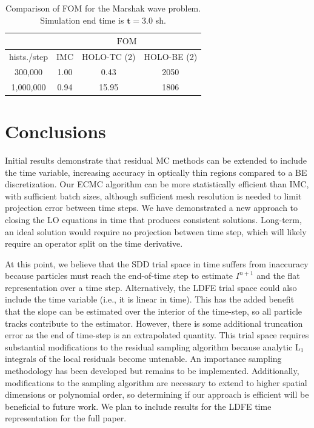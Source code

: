 \documentclass{anstrans}
\newcommand{\FOM}{\ensuremath{\text{FOM}}}
\begin{document}
\begin{table}[H]
\centering
\caption{\label{tab:marshak_cont} {Comparison of FOM for the Marshak
    wave problem.  Simulation end time is $\mathbf{t=3.0}$ sh.}}
\begin{tabular}{|c|ccc|}\cline{2-4}
    \multicolumn{1}{c|}{}        &
    \multicolumn{3}{|c|}{\FOM} \\ \hline
hists./step    &  IMC   & HOLO-TC (2) & HOLO-BE (2) \\ \hline
  300,000      &  1.00  &   0.43    & 2050          \\  
  1,000,000    &  0.94  &  15.95    & 1806          \\ \hline
\end{tabular}
\end{table}


\section{Conclusions}

Initial results demonstrate that residual MC methods can be extended to include
the time variable, increasing accuracy in optically thin regions compared to a
BE discretization.   Our ECMC algorithm can be more statistically efficient
than IMC, with sufficient batch sizes, although sufficient mesh resolution is needed to limit projection
error between time steps.  We have demonstrated a new approach to
closing the LO equations in time that produces consistent solutions. Long-term, an ideal solution
would require no projection between time step, which will likely require an operator split
on the time derivative.

At this point, we believe that the SDD trial space in time suffers from inaccuracy because particles must
reach the end-of-time step to estimate $I^{n+1}$ and the flat representation over a time step.  Alternatively, the LDFE trial space
could also include the time variable (i.e., it is linear in time).  This has the added
benefit that the slope can be estimated over the interior of the time-step, so all
particle tracks contribute to the estimator.  However, there is some additional truncation
error as the end of time-step is an extrapolated quantity.  This trial space requires substantial modifications to the residual sampling
algorithm because analytic L$_1$ integrals of the local residuals become untenable.  An
importance sampling methodology has been developed but remains to be implemented.  Additionally, modifications to the sampling
algorithm are necessary to extend to higher spatial dimensions or polynomial order, so determining if our
approach is efficient will be beneficial to future work. We plan to include results
for the LDFE time representation for the full paper. 





\end{document}
